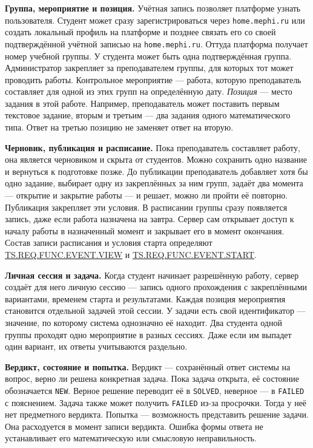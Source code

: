 \documentclass[12pt,a4paper]{article}
\begin{document}
\textbf{Группа, мероприятие и позиция.} Учётная запись позволяет платформе узнать пользователя. Студент может сразу зарегистрироваться через \texttt{home.\allowbreak{}mephi.\allowbreak{}ru} или создать локальный профиль на платформе и позднее связать его со своей подтверждённой учётной записью на \texttt{home.\allowbreak{}mephi.\allowbreak{}ru}. Оттуда платформа получает номер учебной группы. У студента может быть одна подтверждённая группа. Администратор закрепляет за преподавателем группы, для которых тот может проводить работы. Контрольное мероприятие --- работа, которую преподаватель составляет для одной из этих групп на определённую дату. \emph{Позиция} --- место задания в этой работе. Например, преподаватель может поставить первым текстовое задание, вторым и третьим --- два задания одного математического типа. Ответ на третью позицию не заменяет ответ на вторую.

\textbf{Черновик, публикация и расписание.} Пока преподаватель составляет работу, она является черновиком и скрыта от студентов. Можно сохранить одно название и вернуться к подготовке позже. До публикации преподаватель добавляет хотя бы одно задание, выбирает одну из закреплённых за ним групп, задаёт два момента --- открытие и закрытие работы --- и решает, можно ли пройти её повторно. Публикация закрепляет эти условия. В расписании группы сразу появляется запись, даже если работа назначена на завтра. Сервер сам открывает доступ к началу работы в назначенный момент и закрывает его в момент окончания. Состав записи расписания и условия старта определяют {\hyperlink{ts-req-func-event-view}{TS.REQ.FUNC.EVENT.VIEW}} и {\hyperlink{ts-req-func-event-start}{TS.REQ.FUNC.EVENT.START}}.

\textbf{Личная сессия и задача.} Когда студент начинает разрешённую работу, сервер создаёт для него личную сессию --- запись одного прохождения с закреплёнными вариантами, временем старта и результатами. Каждая позиция мероприятия становится отдельной задачей этой сессии. У задачи есть свой идентификатор --- значение, по которому система однозначно её находит. Два студента одной группы проходят одно мероприятие в разных сессиях. Даже если им выпадет один вариант, их ответы учитываются раздельно.

\textbf{Вердикт, состояние и попытка.} Вердикт --- сохранённый ответ системы на вопрос, верно ли решена конкретная задача. Пока задача открыта, её состояние обозначается \texttt{NEW}. Верное решение переводит её в \texttt{SOLVED}, неверное --- в \texttt{FAILED} с пояснением. Задача также может получить \texttt{FAILED} из-за просрочки. Тогда у неё нет предметного вердикта. Попытка --- возможность представить решение задачи. Она расходуется в момент записи вердикта. Ошибка формы ответа не устанавливает его математическую или смысловую неправильность.
\end{document}
